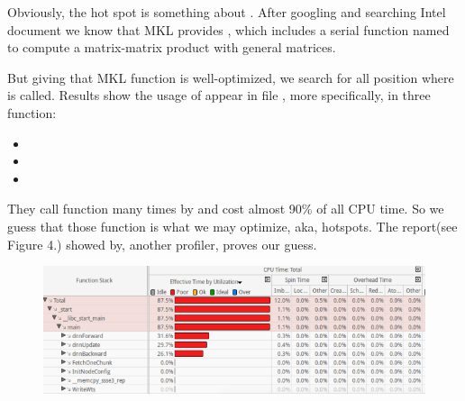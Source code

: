 \documentclass{article}
\begin{document}
Obviously, the hot spot is something about . After googling
and searching Intel document we know that MKL provides , which includes a serial function named 
to compute a matrix-matrix product with general matrices.%

But giving that MKL function is well-optimized, we search for all position where  is called. Results show the usage of  appear in file , more specifically, in three function:%

\begin{itemize}[noitemsep,topsep=\mdcompacttopsep]%

\item{}%

\item{}%

\item{}%
\end{itemize}%

\noindent{}They call  function  many times by  and 
cost almost 90\% of all CPU time. So we guess that those function
 is what we may optimize, aka, hotspots.
The report(see Figure 4.) showed by, another profiler, proves our guess.%

\begin{figure}[tbp]%
\begin{mdcenter}%

\noindent{}\includegraphics[keepaspectratio=true,width=\dimmin{}{\dimwidth{0.90}}]{images/2016-02-19-10-36-25-}{}%

\mdhr{}%

\noindent{}%
\end{mdcenter}\label{fig-myfigure}%
\end{figure}%
\end{document}
